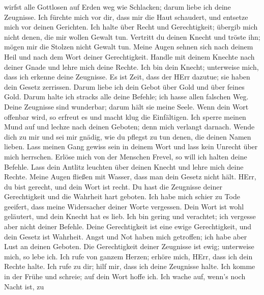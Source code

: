 wirfst alle Gottlosen auf Erden weg wie Schlacken; darum liebe ich deine
Zeugnisse.  Ich fürchte mich vor dir, dass mir die Haut
schaudert, und entsetze mich vor deinen Gerichten.  Ich
halte über Recht und Gerechtigkeit; übergib mich nicht denen, die mir
wollen Gewalt tun.  Vertritt du deinen Knecht und tröste
ihn; mögen mir die Stolzen nicht Gewalt tun.  Meine Augen
sehnen sich nach deinem Heil und nach dem Wort deiner Gerechtigkeit.
 Handle mit deinem Knechte nach deiner Gnade und lehre
mich deine Rechte.  Ich bin dein Knecht; unterweise mich,
dass ich erkenne deine Zeugnisse.  Es ist Zeit, dass der
HErr dazutue; sie haben dein Gesetz zerrissen.  Darum
liebe ich dein Gebot über Gold und über feines Gold. 
Darum halte ich stracks alle deine Befehle; ich hasse allen falschen
Weg.  Deine Zeugnisse sind wunderbar; darum hält sie meine
Seele.  Wenn dein Wort offenbar wird, so erfreut es und
macht klug die Einfältigen.  Ich sperre meinen Mund auf
und lechze nach deinen Geboten; denn mich verlangt darnach.
 Wende dich zu mir und sei mir gnädig, wie du pflegst zu
tun denen, die deinen Namen lieben.  Lass meinen Gang
gewiss sein in deinem Wort und lass kein Unrecht über mich herrschen.
 Erlöse mich von der Menschen Frevel, so will ich halten
deine Befehle.  Lass dein Antlitz leuchten über deinen
Knecht und lehre mich deine Rechte.  Meine Augen fließen
mit Wasser, dass man dein Gesetz nicht hält.  HErr, du
bist gerecht, und dein Wort ist recht.  Du hast die
Zeugnisse deiner Gerechtigkeit und die Wahrheit hart geboten.
 Ich habe mich schier zu Tode geeifert, dass meine
Widersacher deiner Worte vergessen.  Dein Wort ist wohl
geläutert, und dein Knecht hat es lieb.  Ich bin gering
und verachtet; ich vergesse aber nicht deiner Befehle. 
Deine Gerechtigkeit ist eine ewige Gerechtigkeit, und dein Gesetz ist
Wahrheit.  Angst und Not haben mich getroffen; ich habe
aber Lust an deinen Geboten.  Die Gerechtigkeit deiner
Zeugnisse ist ewig; unterweise mich, so lebe ich.  Ich
rufe von ganzem Herzen; erhöre mich, HErr, dass ich dein Rechte halte.
 Ich rufe zu dir; hilf mir, dass ich deine Zeugnisse
halte.  Ich komme in der Frühe und schreie; auf dein Wort
hoffe ich.  Ich wache auf, wenn's noch Nacht ist, zu
